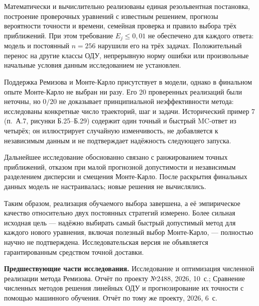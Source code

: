 Математически и вычислительно реализованы единая резольвентная постановка, построение проверочных уравнений с известным решением, прогнозы вероятности точности и времени, семейная проверка и правило выбора трёх приближений. При этом требование $E_j\le0{,}01$ не обеспечено для каждого ответа: модель и постоянный $n=256$ нарушили его на трёх задачах. Положительный перенос на другие классы ОДУ, непрерывную норму ошибки или произвольные начальные условия данным исследованием не установлен.

Поддержка Ремизова и Монте-Карло присутствует в модели, однако в финальном опыте Монте-Карло не выбран ни разу. Его 20 проверенных реализаций были неточны, но $0/20$ не доказывает принципиальной неэффективности метода: исследованы конкретные число траекторий, шаг и задачи. Исторический пример 7 (п.~А.7, рисунки Б.25--Б.29) содержит один точный и быстрый MC-ответ из четырёх; он иллюстрирует случайную изменчивость, не добавляется к независимым данным и не подтверждает надёжность следующего запуска.

Дальнейшее исследование обоснованно связано с ранжированием точных приближений, отказом при малой прогнозной допустимости и независимым разделением дисперсии и смещения Монте-Карло. После раскрытия финальных данных модель не настраивалась; новые решения не вычислялись.

Таким образом, реализация обучаемого выбора завершена, а её эмпирическое качество относительно двух постоянных стратегий измерено. Более сильная исходная цель --- надёжно выбирать самый быстрый допустимый метод для каждого нового уравнения, включая полезный выбор Монте-Карло, --- полностью научно не подтверждена. Исследовательская версия не объявляется гарантированным средством точной доставки.

\vspace{4pt}\noindent\textbf{Предшествующие части исследования.} Исследование и оптимизация численной реализации метода Ремизова. Отчёт по проекту №2488, 2026, 10~с.; Сравнение численных методов решения линейных ОДУ и прогнозирование их точности с помощью машинного обучения. Отчёт по тому же проекту, 2026, 6~с.

